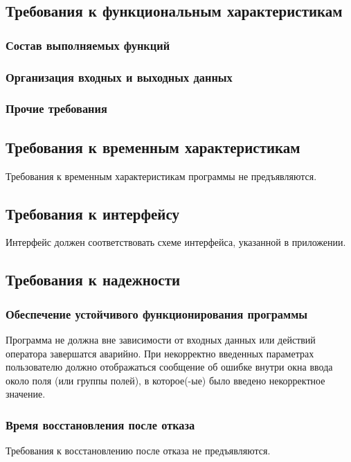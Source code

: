 

\subsection{Требования к функциональным характеристикам}
\subsubsection{Состав выполняемых функций}
\subsubsection{Организация входных и выходных данных}
\subsubsection{Прочие требования}


\subsection{Требования к временным характеристикам}
Требования к временным характеристикам программы не предъявляются.


\subsection{Требования к интерфейсу}
Интерфейс должен соответствовать схеме интерфейса, указанной в приложении.


\subsection{Требования к надежности}
\subsubsection{Обеспечение устойчивого функционирования программы}
Программа не должна вне зависимости от входных данных или действий оператора завершатся аварийно. При некорректно введенных параметрах пользователю должно отображаться сообщение об ошибке внутри окна ввода около поля (или группы полей), в которое(-ые) было введено некорректное значение.
\subsubsection{Время восстановления после отказа}
Требования к восстановлению после отказа не предъявляются.
